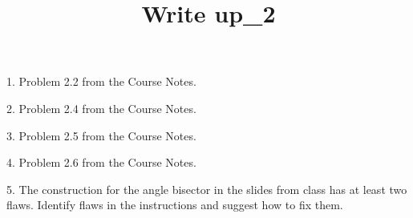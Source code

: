 \documentclass{article}
\title{Write up\_2}
\date{}
\begin{document}
\maketitle

1.  Problem 2.2 from the Course Notes.

2. Problem 2.4 from the Course Notes.

3. Problem 2.5 from the Course Notes.

4. Problem 2.6 from the Course Notes.

5. The construction for the angle bisector in the slides from class has at least two flaws.  Identify flaws in the instructions and suggest how to fix them.
\end{document}
